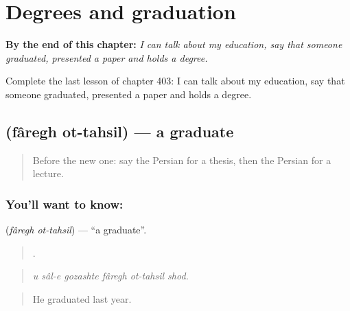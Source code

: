 
\chapter{Degrees and graduation}
\label{ch:fa-degrees-and-graduation}

\begin{chapteropening}
\textbf{By the end of this chapter:} \emph{I can talk about my education, say that someone graduated, presented a paper and holds a degree.}

Complete the last lesson of chapter 403: I can talk about my education, say that someone graduated, presented a paper and holds a degree.
\end{chapteropening}

\section[\texorpdfstring{\fa{فارغ} \fa{التحصیل} (fâregh ot-tahsil)}{فارغ التحصیل (fâregh ot-tahsil)}]{  (fâregh ot-tahsil) — a graduate}

\label{lesson:FA-C403-faregh-ot-tahsil}



\begin{quote}
Before the new one: say the Persian for a thesis, then the Persian for a lecture.
\end{quote}

\subsection*{You'll want to know:  }
\textbf{ } (\emph{fâregh ot-tahsil}) — \textquotedblleft{}a graduate\textquotedblright{}.

\begin{quote}
     .
\end{quote}

\begin{quote}
\emph{u sâl-e gozashte fâregh ot-tahsil shod.}
\end{quote}

\begin{quote}
He graduated last year.
\end{quote}

